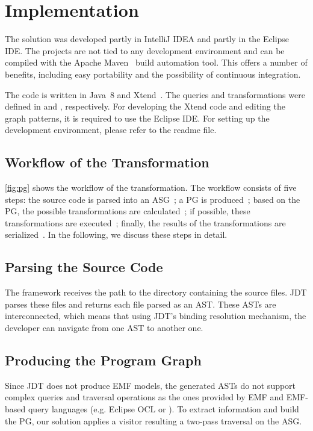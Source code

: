 \documentclass[submission,copyright,creativecommons]{eptcs}
\begin{document}
\section{Implementation}

The solution was developed partly in IntelliJ IDEA and partly in the Eclipse IDE. The projects are not tied to any development environment and can be compiled with the Apache Maven~\cite{Maven} build automation tool. This offers a number of benefits, including easy portability and the possibility of continuous integration.

The code is written in Java~8 and Xtend~\cite{Xtend}. The queries and transformations were defined in \eiq and \viatra, respectively. For developing the Xtend code and editing the graph patterns, it is required to use the Eclipse IDE. For setting up the development environment, please refer to the readme file. 

\subsection{Workflow of the Transformation}


\noindent\autoref{fig:pg} shows the workflow of the transformation. The workflow consists of five steps: the source code is parsed into an ASG~; a PG is produced~; based on the PG, the possible transformations are calculated~; if possible, these transformations are executed~; finally, the results of the transformations are serialized~. In the following, we discuss these steps in detail.

\subsection[Parsing the Source Code]{Parsing the Source Code\qquad{}}
The framework receives the path to the directory containing the source files. JDT parses these files and returns each file parsed as an AST. These ASTs are interconnected, which means that using JDT's binding resolution mechanism, the developer can navigate from one AST to another one.

\subsection[Producing the Program Graph]{Producing the Program Graph\qquad{}}
Since JDT does not produce EMF models, the generated ASTs do not support complex queries and traversal operations as the ones provided by EMF and EMF-based query languages (e.g. Eclipse OCL or \eiq). To extract information and build the PG, our solution applies a visitor resulting a two-pass traversal on the ASG.
\end{document}
